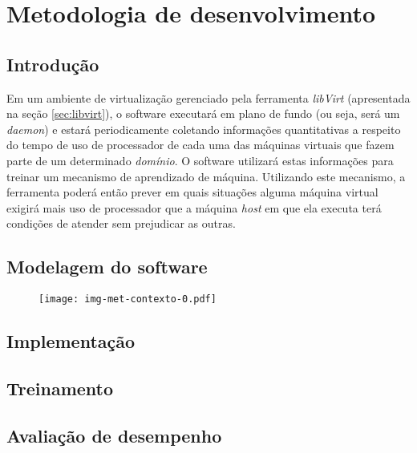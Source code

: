%
%
%
% 
%
%

\chapter{Metodologia de desenvolvimento}\label{sec:meto}

\section{Introdução}

Em um ambiente de virtualização gerenciado pela ferramenta \emph{libVirt}
(apresentada na seção \ref{sec:libvirt}), o software executará em plano de
fundo (ou seja, será um \emph{daemon}) e estará periodicamente coletando
informações quantitativas a respeito do tempo de uso de processador de
cada uma das máquinas virtuais que fazem parte de um determinado
\emph{domínio}. O software utilizará estas informações para treinar um
mecanismo de aprendizado de máquina. Utilizando este mecanismo, a
ferramenta poderá então prever em quais situações alguma máquina virtual
exigirá mais uso de processador que a máquina \emph{host} em que ela
executa terá condições de atender sem prejudicar as outras.

\section{Modelagem do software}

\begin{figure}[htp]
\centering
\texttt{[image: img-met-contexto-0.pdf]}
\label{fig:contexto0}
\end{figure}


\section{Implementação}


\section{Treinamento}

\section{Avaliação de desempenho}\label{sec:desemp}

